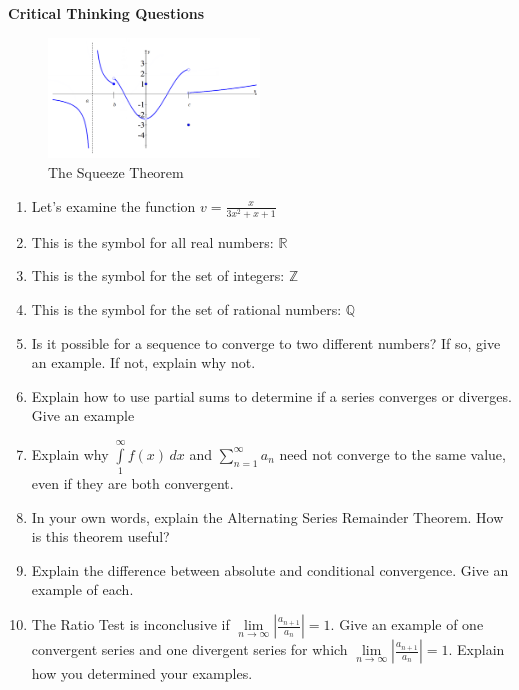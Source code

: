 \documentclass[10pt, letterpaper]{article}
\def\eq1{v=\frac{x}{3x^2+x+1}}
\newcommand{\set}[1]{\setlength\itemsep{#1em}}
\begin{document}
 
\textbf{Critical Thinking Questions}
\begin{figure}[H] %
	\centering
\includegraphics[width=0.5\textwidth]{limit} %
\caption{The Squeeze Theorem} %
\end{figure}

\begin{enumerate}
\set{1}
\item Let's examine the function $\eq1$ %
\item This is the symbol for all real numbers: $\mathbb{R}$
\item This is the symbol for the set of integers: $\mathbb{Z}$
\item This is the symbol for the set of rational numbers: $\mathbb{Q}$
\item Is it possible for a sequence to converge to two different numbers? If so, give an example. If not, explain why not.
\item Explain how to use partial sums to determine if a series converges or diverges. Give an example
\item Explain why $\int\limits_{1}^{\infty} f(x)\,dx$ and $\sum\limits_{n=1}^{\infty} a_n$ need not converge to the same value, even if they are both convergent.
\item  In your own words, explain the Alternating Series Remainder Theorem. How is this theorem useful?
\item Explain the difference between absolute and conditional convergence. Give an example of each.
\item The Ratio Test is inconclusive if $\displaystyle{\lim\limits_{n \to \infty} \left| \frac{a_{n+1}}{a_n} \right| =1}$. Give an example of one convergent series and one divergent series for which $\displaystyle{\lim\limits_{n \to \infty} \left| \frac{a_{n+1}}{a_n} \right| =1}$. Explain how you determined your examples.
\end{enumerate}
\end{document}
